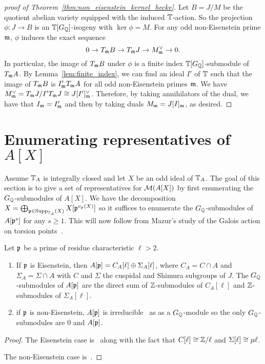 \documentclass[11pt, proquest]{uwthesis}
\begin{document}
\begin{proof}[proof of Theorem~\ref{thm:non_eisenstein_kernel_hecke}]
    Let $B=J/M$ be the quotient abelian variety equipped with the induced
    $\mathbb{T}$-action. So the projection $\phi:J \to B$ is an $\mathbb{T}[G_{\mathbb{Q}}]$-isogeny
    with $\ker\phi = M$. For any odd non-Eisenstein prime $\mathfrak{m}$, $\phi$ induces
    the exact sequence
    \[ 
        0 \to T_{\mathfrak{m}} B \to T_{\mathfrak{m}} J \to M^\vee _{\mathfrak{m}} \to 0.
    \] 
    In particular, the image of $T_{\mathfrak{m}} B$ under $\phi$ is a finite index
    $\mathbb{T}[G_{\mathbb{Q}}]$-submodule of $T_{\mathfrak{m}} A$. By Lemma~\ref{lem:finite_index}, we can find
    an ideal $I'$ of $\mathbb{T}$ such that the image of $T_{\mathfrak{m}} B$ is $I' _{\mathfrak{m}} T_{\mathfrak{m}} A$
    for all odd non-Eisenstein primes $\mathfrak{m}$. We have $M^\vee _{\mathfrak{m}} = T_{\mathfrak{m}} J / I'
    T_{\mathfrak{m}} J\cong J[I']_{\mathfrak{m}} ^\vee$. Therefore, by taking annihilators of the dual,
    we have that $I_{\mathfrak{m}} = I'_{\mathfrak{m}}$ and then by taking duals $M_{\mathfrak{m}} = J[I]_{\mathfrak{m}}$, as
    desired.
\end{proof}

\section{Enumerating representatives of $A[X]$}

Assume $\mathbb{T}_A$ is integrally closed and let $X$ be an odd ideal of $\mathbb{T}_A$. The
goal of this section is to give a set of representatives for $\mathcal{M}(A[X])$ by
first enumerating the $G_{\mathbb{Q}}$-submodules of $A[X]$. We
have the decomposition $X=\bigoplus_{\mathfrak{p}\in \operatorname{Supp}_{\mathbb{T}_A} (X)} X[\mathfrak{p}^{v_{\mathfrak{p}}(X)}]$
so it suffices to enumerate the $G_{\mathbb{Q}}$-submodules of $A[\mathfrak{p}^s]$ for any $s\geq
1$. This will now follow from Mazur's study of the Galois action on torsion
points~\cite[\S 14]{mazur:eisenstein}.

\begin{proposition}[Mazur]\label{prop:all_G_subs}
    Let $\mathfrak{p}$ be a prime of residue characteristic $\ell>2$.
    \begin{enumerate}
        \item 
            If $\mathfrak{p}$ is Eisenstein, then $A[\mathfrak{p}]=C_A[\ell]\oplus \Sigma_A[\ell]$,
            where $C_A=C\cap A$ and $\Sigma_A=\Sigma \cap A$ with $C$ and
            $\Sigma$ the cuspidal and Shimura subgroups of $J$. The
            $G_{\mathbb{Q}}$-submodules of $A[\mathfrak{p}]$ are the direct sum of $\mathbb{Z}$-submodules of
            $C_A[\ell]$ and $\mathbb{Z}$-submodules of $\Sigma_A[\ell]$.
        \item
            if $\mathfrak{p}$ is non-Eisenstein, $A[\mathfrak{p}]$ is irreducible~\cite[Prop
            14.2]{mazur:eisenstein} as as a $G_{\mathbb{Q}}$-module so the only
            $G_{\mathbb{Q}}$-submodules are $0$ and $A[\mathfrak{p}]$.
    \end{enumerate}
\end{proposition}
\begin{proof}
    The Eisenstein case is~\cite[Corollary 16.3]{mazur:eisenstein} along with
    the fact that $C[\ell]\cong \mathbb{Z}/\ell$ and $\Sigma[\ell]\cong \mu\ell$.

    The non-Eisenstein case is~\cite[Propositon 14.2]{mazur:eisenstein}.
\end{proof}
\end{document}
